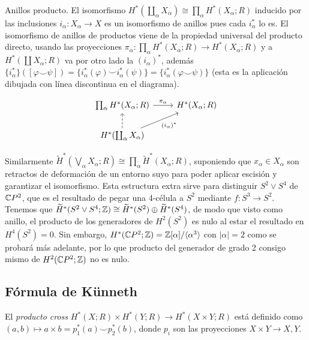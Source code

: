 \documentclass[TA.tex]{subfiles}
\begin{document}
\begin{ej}
Anillos producto. El isomorfismo $H^*(\coprod_\alpha X_\alpha)\cong \prod_\alpha H^*(X_\alpha;R)$ inducido por las inclusiones $i_\alpha:X_\alpha\to X$ es un isomorfismo de anillos pues cada $i_\alpha^*$ lo es. El isomorfismo de anillos de productos viene de la propiedad universal del producto directo, usando las proyecciones $\pi_\alpha:\prod_\alpha H^*(X_\alpha;R)\to H^*(X_\alpha;R)$ y a $H^*(\coprod X_\alpha;R)$ va por otro lado la $(i_\alpha)^*$, además $\{i_\alpha^*\}([\varphi\smile\psi])=\{i^*_\alpha(\varphi)\smile i_\alpha^*(\psi)\}=\{i^*_\alpha(\varphi\smile\psi)\}$ (esta es la aplicación dibujada con línea discontinua en el diagrama).

\[
\begin{tikzcd}
\prod_\alpha H^*( X_\alpha;R)\arrow[r, "\pi_\alpha"] & H^*(X_\alpha;R)\\
H^*(\coprod_\alpha X_\alpha)\arrow[ur, "(i_\alpha)^*"']\arrow[u, dashed]
\end{tikzcd}
\]

 Similarmente $\widetilde{H}^*(\bigvee_\alpha X_\alpha;R)\cong\prod_\alpha\widetilde{H}^*(X_\alpha;R)$, suponiendo que $x_\alpha\in X_\alpha$ son retractos de deformación de un entorno suyo para poder aplicar escisión y garantizar el isomorfismo. Esta estructura extra sirve para distinguir $S^2\vee S^4$ de $\mathbb{C} P^2$, que es el resultado de pegar una 4-célula a $S^2$ mediante $f:S^3\to S^2$. Tenemos que $\widetilde{H}^*(S^2\vee S^4;\mathbb{Z})\cong \widetilde{H}^*(S^2)\oplus \widetilde{H}^*(S^4)$, de modo que visto como anillo, el producto de los generadores de $H^2(S^2)$ es nulo al estar el resultado en $H^4(S^2)=0$. Sin embargo, $H^*(\mathbb{C} P^2;\mathbb{Z})=\mathbb{Z}[\alpha]/\langle{\alpha^3}\rangle$ con $|\alpha|=2$ como se probará más adelante, por lo que producto del generador de grado 2 consigo mismo de $H^2(\mathbb{C} P^2;\mathbb{Z})$ no es nulo.
\end{ej}

\subsection{Fórmula de Künneth}
\begin{defi}
El \emph{producto cross} $H^*(X;R)\times H^*(Y;R)\to H^*(X\times Y;R)$ está definido como $(a,b)\mapsto a\times b=p_1^*(a)\smile p_2^*(b)$, donde $p_i$ son las proyecciones $X\times Y\to X,Y$. 
\end{defi}
\end{document}

